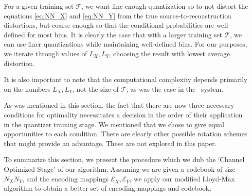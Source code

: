 For a given training set $\mathcal T$, we want fine enough quantization so to not distort the equations \eqref{eq:NN_X} and \eqref{eq:NN_Y} from the true source-to-reconstruction distortions, but coarse enough so that the conditional probabilities are well-defined for most bins. It is clearly the case that with a larger training set $\mathcal T$, we can use finer quantizations while maintaining well-defined bins. For our purposes, we iterate through values of $L_X, L_Y$, choosing the result with lowest average distortion.

It is also important to note that the computational complexity depends primarily on the numbers $L_X, L_Y$, not the size of $\mathcal T$, as was the case in the \sysII\ system.

As was mentioned in this section, the fact that there are now three necessary conditions for optimality necessitates a decision in the order of their application in the quantizer training stage. We mentioned that we chose to give equal opportunities to each condition. There are clearly other possible rotation schemes that might provide an advantage. These are not explored in this paper.

To summarize this section, we present the procedure which we dub the `Channel Optimized Stage' of our algorithm. Assuming we are given a codebook of size $N_X N_Y$, and the encoding mappings $\mathcal E_{\bar X}, \mathcal E_{\bar Y}$, we apply our modified Lloyd-Max algorithm to obtain a better set of encoding mappings and codebook.

